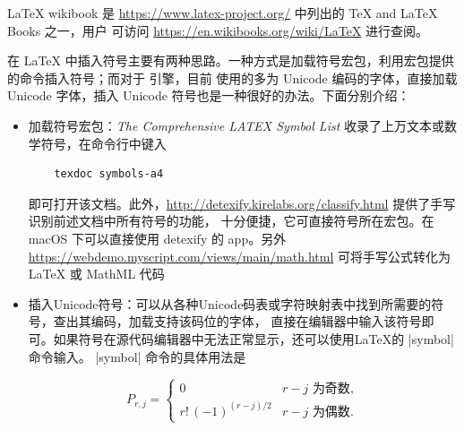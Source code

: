 








\LaTeX{} wikibook 是 \url{https://www.latex-project.org/} 中列出的 \TeX{} and \LaTeX{} Books 之一，用户
可访问 \url{https://en.wikibooks.org/wiki/LaTeX} 进行查阅。



在 \LaTeX{} 中插入符号主要有两种思路。一种方式是加载符号宏包，利用宏包提供的命令插入符号；而对于 \XeTeX{} 引擎，目前
使用的多为 Unicode 编码的字体，直接加载 Unicode 字体，插入 Unicode 符号也是一种很好的办法。下面分别介绍：
\begin{itemize}
  \item 加载符号宏包：\emph{The Comprehensive LATEX Symbol List} 收录了上万文本或数学符号，在命令行中键入
  \begin{verbatim}
    texdoc symbols-a4
  \end{verbatim}
  即可打开该文档。此外，\url{http://detexify.kirelabs.org/classify.html} 提供了手写识别前述文档中所有符号的功能，
  十分便捷，它可直接符号所在宏包。在 macOS 下可以直接使用 detexify 的 app。另外
  \url{https://webdemo.myscript.com/views/main/math.html} 可将手写公式转化为 \LaTeX{} 或 MathML 代码
  \item 插入Unicode符号：可以从各种Unicode码表或字符映射表中找到所需要的符号，查出其编码，加载支持该码位的字体，
  直接在编辑器中输入该符号即可。如果符号在源代码编辑器中无法正常显示，还可以使用\LaTeX{}的 |symbol| 命令输入。
  |symbol| 命令的具体用法是
\begin{texcode}
\end{texcode}

\begin{texcode}
  \[
  P_{r,j}=\left\{\begin{array}{ll}
    0 & \text{$r-j$ 为奇数},\\
    r!\,(-1)^{(r-j)/2} &
    \text{$r-j$ 为偶数}.
  \end{array}\right.
  \]
\end{texcode}

\end{itemize}

